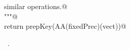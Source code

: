 \documentclass[11pt,oneside]{article}	%
\begin{document}
\begin{flushleft}
\begin{list}{}{}
\mbox{}\verb@   similar operations.@\\
\mbox{}\verb@   """@\\
\mbox{}\verb@   return prepKey(AA(fixedPrec)(vect))@\\
\mbox{}\verb@@{\NWsep}
\end{list}
\vspace{-1ex}
\footnotesize\addtolength{\baselineskip}{-1ex}
\begin{list}{}{\setlength{\itemsep}{-\parsep}\setlength{\itemindent}{-\leftmargin}}
\item \NWtxtMacroRefIn\ .
\end{list}
\end{flushleft}




\end{document}
